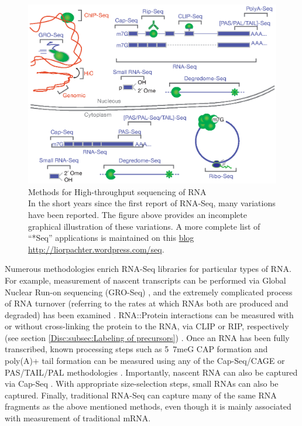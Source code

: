     \begin{figure} %
      \centering
      \includegraphics{Figures/Intro/RNA_Sequencing_methodologies.eps}
      \caption[Methods for High-throughput sequencing of RNA]
      {
      Methods for High-throughput sequencing of RNA\\[0.25cm]
      In the short years since the first report of RNA-Seq, many variations have been reported. The figure above provides an incomplete graphical illustration of these variations. A more complete list of ``*Seq'' applications is maintained on this \href{http://liorpachter.wordpress.com/seq/}{blog} \url{http://liorpachter.wordpress.com/seq}.
      }
      \label{Intro:fig:htsMethods}
      \end{figure}

    Numerous methodologies enrich RNA-Seq libraries for particular types of RNA. For example, measurement of nascent transcripts can be performed via Global Nuclear Run-on sequencing (GRO-Seq) \citep{Core2008a}, and the extremely complicated process of RNA turnover (referring to the rates at which RNAs both are produced and degraded) has been examined \citep{Ghosh2010a, Tani2012}. RNA::Protein interactions can be measured with or without cross-linking the protein to the RNA, via CLIP or RIP, respectively (see section \ref{Disc:subsec:Labeling of precursors}) \citep{Ule2005,Licatalosi2006,Singh2013}. Once an RNA has been fully transcribed, known processing steps such as 5\textprime~7meG CAP formation and poly(A)+ tail formation can be measured using any of the Cap-Seq/CAGE \citep{Shiraki2003a} or PAS/TAIL/PAL methodologies \citep{Shepard2011, Chang2014b, Subtelny2014}. Importantly, nascent RNA can also be captured via Cap-Seq \citep{Kruesi2013}. With appropriate size-selection steps, small RNAs \citep{Ghildiyal2008} can also be captured. Finally, traditional RNA-Seq can capture many of the same RNA fragments as the above mentioned methods, even though it is mainly associated with measurement of traditional mRNA.

